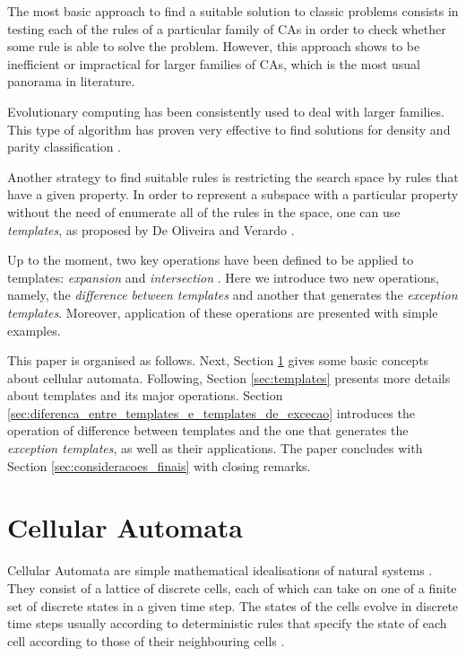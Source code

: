 \documentclass{llncs}
\begin{document}
The most basic approach to find a suitable solution to classic problems consists in testing each of the rules of a particular family of CAs in order to check whether some rule is able to solve the problem. However, this approach shows to be inefficient or impractical for larger families of CAs, which is the most usual panorama in literature.

Evolutionary computing has been consistently used to deal with larger families. This type of algorithm has proven very effective to find solutions for density and parity classification \cite{wolz2008very}.

Another strategy to find suitable rules is restricting the search space by rules that have a given property. In order to represent a subspace with a particular property without the need of enumerate all of the rules in the space, one can use \textit{templates}, as proposed by De Oliveira and Verardo  \cite{deOliveira2014,deOliveira2014b}.

Up to the moment, two key operations have been defined to be applied to templates: \textit{expansion} and \textit{intersection} \cite{deOliveira2014,deOliveira2014b}. Here we introduce two new operations, namely, the \textit{difference between templates} and another that generates the \textit{exception templates}. Moreover, application of these operations are presented with simple examples.

This paper is organised as follows. Next, Section \ref{sec:automatos_celulares} gives some basic concepts about cellular automata. Following, Section \ref{sec:templates} presents more details about templates and its major operations. Section \ref{sec:diferenca_entre_templates_e_templates_de_excecao} introduces the operation of difference between templates and the one that generates the \textit{exception templates}, as well as their applications. The paper concludes with Section \ref{sec:consideracoes_finais} with closing remarks.

\section{Cellular Automata}
\label{sec:automatos_celulares}
Cellular Automata are simple mathematical idealisations of natural systems \cite{wolfram1994cellular}. They consist of a lattice of discrete cells, each of which can take on one of a finite set of discrete states in a given time step. The states of the cells evolve in discrete time steps usually according to deterministic rules that specify the state of each cell according to those of their neighbouring cells \cite{wolfram1994cellular}.
\end{document}
